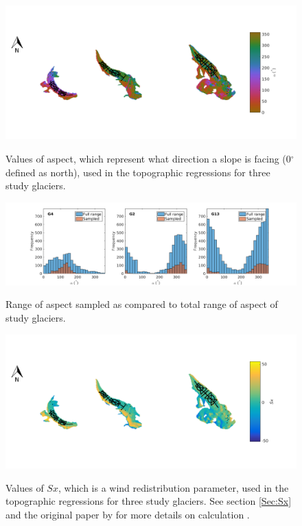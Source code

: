 \documentclass[12pt]{article}
\begin{document}
\begin{landscape}
\begin{figure}
	\centering
	\includegraphics[height = 0.4\textwidth]{Map_aspect.png}\\
	\caption{Values of aspect, which represent what direction a slope is facing (0${^\circ}$ defined as north), used in the topographic regressions for three study glaciers.}
	\label{map:aspect}
\end{figure}

\begin{figure}
	\centering
	\includegraphics[height = 0.4\textwidth]{SampledRangeTopo_aspect.png}\\
	\caption{Range of aspect sampled as compared to total range of aspect of study glaciers.}
	\label{sampledRange:aspect}
\end{figure}

\begin{figure}
	\centering
	\includegraphics[height = 0.4\textwidth]{Map_Sx.png}\\
	\caption{Values of $Sx$, which is a wind redistribution parameter, used in the topographic regressions for three study glaciers. See section \ref{Sec:Sx} and the original paper by \cite{Winstral2002} for more details on calculation .}
	\label{map:Sx}
\end{figure}


\end{landscape}
\end{document}
